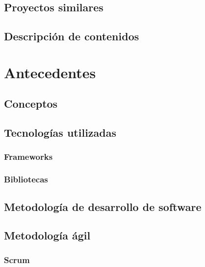 \documentclass{iccmemoria}
\begin{document}
	\section{Proyectos similares}
	

	\section{Descripción de contenidos}
	

\chapter{Antecedentes}


	\section{Conceptos}
	\label{sec:Conceptos}
	

	\section{Tecnologías utilizadas}
	\label{sec:Tecnologias}
		
		\subsection{Frameworks}

		
		\subsection{Bibliotecas}

		
		
	\section{Metodología de desarrollo de software}
		

	\section{Metodología ágil}
	

		\subsection{Scrum}
		
\end{document}
